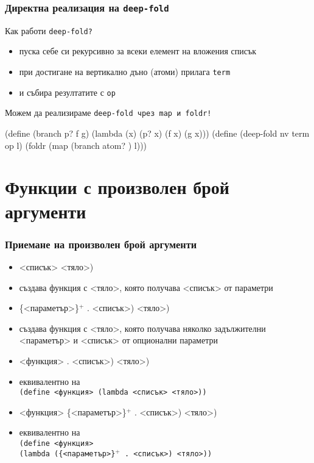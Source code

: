 \documentclass{beamer}
\begin{document}
\begin{frame}[fragile]
  \frametitle{Директна реализация на \tt{deep-fold}}

  Как работи \tt{deep-fold}?
  \pause
  \begin{itemize}[<+->]
  \item пуска себе си рекурсивно за всеки елемент на вложения списък
  \item при достигане на вертикално дъно (атоми) прилага \tt{term}
  \item и събира резултатите с \tt{op}
  \end{itemize}
  \onslide<+->
  Можем да реализираме \tt{deep-fold} чрез \tt{map} и \tt{foldr}!
  \onslide<+->
\begin{semiverbatim}
(define (branch p? f g) (lambda (x) (p? x) (f x) (g x)))
(define (deep-fold nv term op l)
  (foldr  
   (map (branch atom?
                )
        l)))
\end{semiverbatim}
\end{frame}

\section{Функции с произволен брой аргументи}

\begin{frame}
  \frametitle{Приемане на произволен брой аргументи}

  \begin{itemize}[<+->]
  \item {}<списък> <тяло>\tta)
  \item създава функция с <тяло>, която получава <списък> от параметри
  \item {}\{<параметър>\}$^+$ \tta. <списък>\tta) <тяло>\tta)
  \item създава функция с <тяло>, която получава няколко задължителни <параметър> и <списък> от опционални параметри
  \item {}<функция> \tta. <списък>\tta) <тяло>\tta)
  \item еквивалентно на \\
    \tt{(define }<функция> \tt{(lambda }<списък> <тяло>\tt{))}
  \item {}<функция> \{<параметър>\}$^+$ \tta. <списък>\tta) <тяло>\tta)
  \item еквивалентно на \\
    \tt{(define }<функция>\\
    \hspace{10ex}\tt{(lambda (}\{<параметър>\}$^+$ \tt. <списък>\tt) <тяло>\tt{))}
  \end{itemize}
\end{frame}
\end{document}
